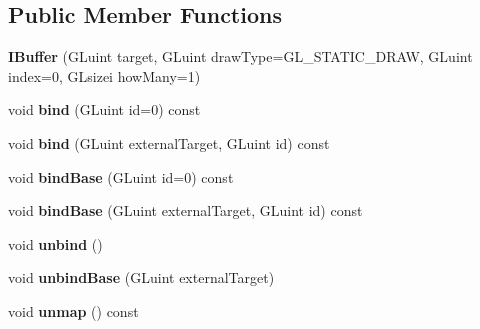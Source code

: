 \subsection*{Public Member Functions}
\begin{DoxyCompactItemize}
\item 
{\bfseries I\+Buffer} (G\+Luint target, G\+Luint draw\+Type=G\+L\+\_\+\+S\+T\+A\+T\+I\+C\+\_\+\+D\+R\+AW, G\+Luint index=0, G\+Lsizei how\+Many=1)\hypertarget{classflw_1_1flc_1_1IBuffer_ad7053cc22011388104c4bcc6ca05599e}{}\label{classflw_1_1flc_1_1IBuffer_ad7053cc22011388104c4bcc6ca05599e}

\item 
void {\bfseries bind} (G\+Luint id=0) const \hypertarget{classflw_1_1flc_1_1IBuffer_ac45d3729b5e4b1fe52d79275a94c4ccc}{}\label{classflw_1_1flc_1_1IBuffer_ac45d3729b5e4b1fe52d79275a94c4ccc}

\item 
void {\bfseries bind} (G\+Luint external\+Target, G\+Luint id) const \hypertarget{classflw_1_1flc_1_1IBuffer_a4d02d0364f840398c213f6c7f9700d8e}{}\label{classflw_1_1flc_1_1IBuffer_a4d02d0364f840398c213f6c7f9700d8e}

\item 
void {\bfseries bind\+Base} (G\+Luint id=0) const \hypertarget{classflw_1_1flc_1_1IBuffer_af229d6fa4fbb30bacb81dcac734db783}{}\label{classflw_1_1flc_1_1IBuffer_af229d6fa4fbb30bacb81dcac734db783}

\item 
void {\bfseries bind\+Base} (G\+Luint external\+Target, G\+Luint id) const \hypertarget{classflw_1_1flc_1_1IBuffer_ab64c3e009a119394f895b3dacf4cc665}{}\label{classflw_1_1flc_1_1IBuffer_ab64c3e009a119394f895b3dacf4cc665}

\item 
void {\bfseries unbind} ()\hypertarget{classflw_1_1flc_1_1IBuffer_aa838099c22a2799d4cad641f8d40e674}{}\label{classflw_1_1flc_1_1IBuffer_aa838099c22a2799d4cad641f8d40e674}

\item 
void {\bfseries unbind\+Base} (G\+Luint external\+Target)\hypertarget{classflw_1_1flc_1_1IBuffer_a1321b63bca1153b09b914f9ca8d52b2a}{}\label{classflw_1_1flc_1_1IBuffer_a1321b63bca1153b09b914f9ca8d52b2a}

\item 
void {\bfseries unmap} () const \hypertarget{classflw_1_1flc_1_1IBuffer_adb045f3a301425168ba2b2bd9009c876}{}\label{classflw_1_1flc_1_1IBuffer_adb045f3a301425168ba2b2bd9009c876}


\end{DoxyCompactItemize}
